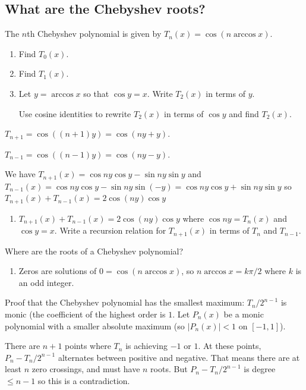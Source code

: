 \documentclass[12pt,letterpaper,noanswers]{exam}
\begin{document}
\subsection*{What are the Chebyshev roots?}
The $n$th Chebyshev polynomial is given by $T_n(x) = \cos(n\arccos x)$.

\begin{enumerate}[resume]
\item Find $T_0(x)$.
\item Find $T_1(x)$.
\item Let $y = \arccos x$ so that $\cos y = x$.  Write $T_2(x)$ in terms of $y$.

Use cosine identities to rewrite $T_2(x)$ in terms of $\cos y$ and find $T_2(x)$.
\end{enumerate}

$T_{n+1} = \cos((n+1)y) = \cos(ny + y)$.

$T_{n-1} = \cos((n-1)y) = \cos(ny - y)$.

We have $T_{n+1}(x) = \cos ny \cos y - \sin ny \sin y$ and $T_{n-1}(x) = \cos ny \cos y - \sin ny \sin (-y) = \cos ny \cos y + \sin ny \sin y$ so
$T_{n+1}(x) + T_{n-1}(x) = 2\cos(ny)\cos y$

\begin{enumerate}[resume]
\item $T_{n+1}(x) + T_{n-1}(x) = 2\cos(ny)\cos y$ where $\cos ny = T_n(x)$ and $\cos y = x$.  Write a recursion relation for $T_{n+1}(x)$ in terms of $T_n$ and $T_{n-1}$.
\end{enumerate}

Where are the roots of a Chebyshev polynomial?
\begin{enumerate}[resume]
\item Zeros are solutions of $0 = \cos(n\arccos x)$, so $n\arccos x = k\pi/2$ where $k$ is an odd integer.  
\end{enumerate}

Proof that the Chebyshev polynomial has the smallest maximum:  $T_n/2^{n-1}$ is monic (the coefficient of the highest order is $1$.  Let $P_n(x)$ be a monic polynomial with a smaller absolute maximum (so $\vert P_n(x)\vert < 1$ on $[-1,1]$).

There are $n+1$ points where $T_n$ is achieving $-1$ or $1$.  At these points, $P_n - T_n/2^{n-1}$ alternates between positive and negative.  That means there are at least $n$ zero crossings, and must have $n$ roots.  But $P_n - T_n/2^{n-1}$ is degree $\leq n-1$ so this is a contradiction.
\end{document}
